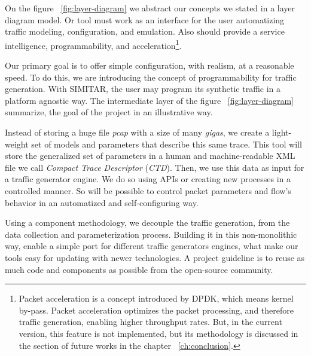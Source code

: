 On the figure ~\ref{fig:layer-diagram} we abstract our concepts we stated in a layer diagram model. Or tool must work as an interface for the user automatizing traffic modeling, configuration, and emulation. Also should provide a service intelligence, programmability, and acceleration\footnote{Packet acceleration is a concept introduced by DPDK\cite{web-dpdk}, which means kernel by-pass. Packet acceleration optimizes the packet processing, and therefore traffic generation, enabling higher throughput rates. But, in the current version, this feature is not implemented, but its methodology is discussed in the section of future works in the chapter ~\ref{ch:conclusion}.}.


Our primary goal is to offer simple configuration, with realism, at a reasonable speed. To do this, we are introducing the concept of programmability for traffic generation. With SIMITAR, the user may program its synthetic traffic in a platform agnostic way. The intermediate layer of the figure ~\ref{fig:layer-diagram} summarize, the goal of the project in an illustrative way.


Instead of storing a huge file \textit{pcap} with a size of many \textit{gigas}, we create a light-weight set of models and parameters that describe this same trace. This tool will store the generalized set of parameters in a human and machine-readable XML file we call \textit{Compact Trace Descriptor} (\textit{CTD}). Then, we use this data as input for a traffic generator engine. We do so using APIs or creating new processes in a controlled manner. So will be possible to control packet parameters and flow's behavior in an automatized and self-configuring way.


Using a component methodology, we decouple the traffic generation, from the data collection and parameterization process. Building it in this non-monolithic way,  enable a simple port for different traffic generators engines, what make our tools easy for updating with newer technologies. A project guideline is to reuse as much code and components as possible from the open-source community.


